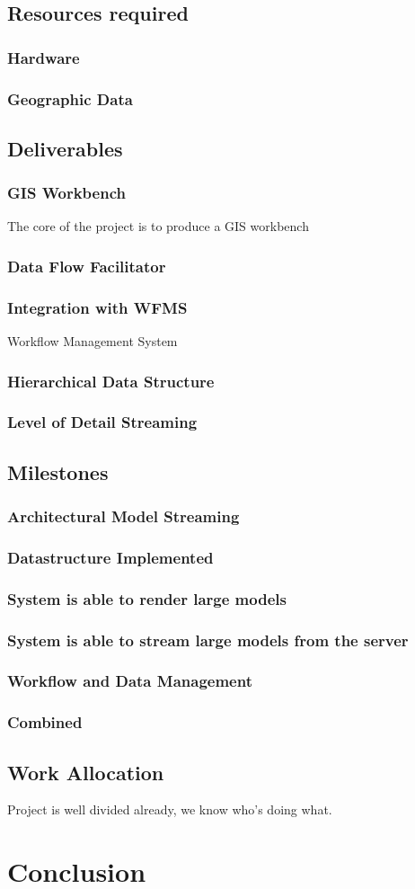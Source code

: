 \documentclass[12pt,a4paper]{article}
\begin{document}
\subsection{Resources required}
\subsubsection*{Hardware}
\subsubsection*{Geographic Data}
\subsection{Deliverables}
\subsubsection{GIS Workbench}
The core of the project is to produce a GIS workbench
\subsubsection{Data Flow Facilitator}
\subsubsection{Integration with WFMS}
Workflow Management System
\subsubsection{Hierarchical Data Structure}
\subsubsection{Level of Detail Streaming}
\subsection{Milestones}
\subsubsection{Architectural Model Streaming}
\subsubsection*{Datastructure Implemented}
\subsubsection*{System is able to render large models}
\subsubsection*{System is able to stream large models from the server}
\subsubsection{Workflow and Data Management}
\subsubsection{Combined}
\subsection{Work Allocation}
Project is well divided already, we know who's doing what.
\section{Conclusion}
\end{document}
